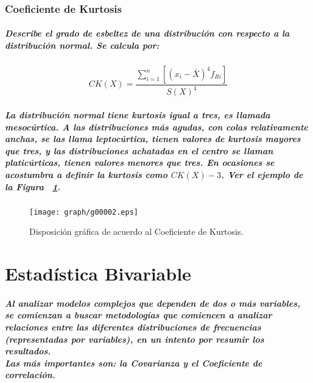 \subsubsection{Coeficiente de Kurtosis}
\subparagraph{
Describe el grado de esbeltez de una distribución con respecto a la distribución normal. Se calcula por:
}
\begin{equation}
CK(X) = \frac{\displaystyle\sum_{i=1}^n[(x_{i}-\bar{X})^4f_{Ri}]}{S(X)^4}
\end{equation}
\subparagraph{
La distribución normal tiene kurtosis igual a tres, es llamada mesocúrtica. A las distribuciones más agudas, con colas relativamente anchas, se las llama leptocúrtica, tienen valores de kurtosis mayores que tres, y las distribuciones achatadas en el centro se llaman platicúrticas, tienen valores menores que tres. En ocasiones se acostumbra a definir la kurtosis como $CK(X) - 3$. Ver el ejemplo de la Figura ~\ref{fig:CoeficienteDeKurtosis}.
}
\begin{figure}[ht]
\centering
\texttt{[image: graph/g00002.eps]}
\caption[Coeficiente de Kurtosis]{Disposición gráfica de acuerdo al Coeficiente de Kurtosis.}
\label{fig:CoeficienteDeKurtosis}
\end{figure}




\section{Estadística Bivariable}
\subparagraph{
Al analizar modelos complejos que dependen de dos o más variables, se comienzan a buscar metodologías que comiencen a analizar relaciones entre las diferentes distribuciones de frecuencias (representadas por variables), en un intento por resumir los resultados.\\
Las más importantes son: la Covarianza y el Coeficiente de correlación.
}


